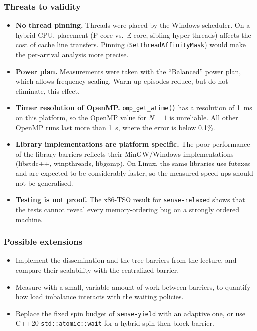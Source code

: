 \subsubsection{Threats to validity}
\label{sec:ex2-threats}

\begin{itemize}
    \item \textbf{No thread pinning.} Threads were placed by the Windows
          scheduler. On a hybrid CPU, placement (P-core vs.\ E-core,
          sibling hyper-threads) affects the cost of cache line transfers.
          Pinning (\texttt{SetThreadAffinityMask}) would make the
          per-arrival analysis more precise.
    \item \textbf{Power plan.} Measurements were taken with the
          ``Balanced'' power plan, which allows frequency scaling. Warm-up
          episodes reduce, but do not eliminate, this effect.
    \item \textbf{Timer resolution of OpenMP.} \texttt{omp\_get\_wtime()}
          has a resolution of \SI{1}{\milli\second} on this platform, so the
          OpenMP value for $N=1$ is unreliable. All other OpenMP runs last
          more than \SI{1}{\second}, where the error is below 0.1\%.
    \item \textbf{Library implementations are platform specific.} The poor
          performance of the library barriers reflects their MinGW/Windows
          implementations (libstdc++, winpthreads, libgomp). On Linux, the
          same libraries use futexes and are expected to be considerably
          faster, so the measured speed-ups should not be generalised.
    \item \textbf{Testing is not proof.} The x86-TSO result for
          \texttt{sense-relaxed} shows that the tests cannot reveal every
          memory-ordering bug on a strongly ordered machine.
\end{itemize}

\subsubsection{Possible extensions}

\begin{itemize}
    \item Implement the dissemination and the tree barriers from the
          lecture, and compare their scalability with the centralized
          barrier.
    \item Measure with a small, variable amount of work between barriers,
          to quantify how load imbalance interacts with the waiting
          policies.
    \item Replace the fixed spin budget of \texttt{sense-yield} with an
          adaptive one, or use C++20 \texttt{std::atomic::wait} for a hybrid
          spin-then-block barrier.
\end{itemize}

